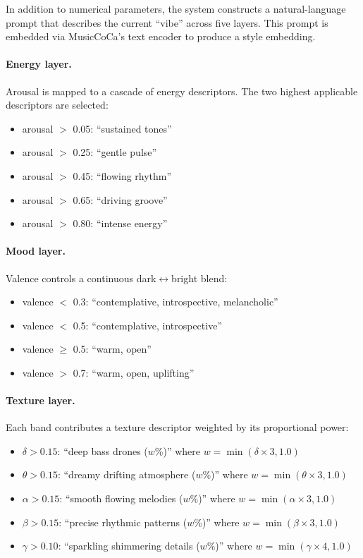 \documentclass[manuscript,review,anonymous]{acmart}
\begin{document}
In addition to numerical parameters, the system constructs a natural-language prompt that describes the current ``vibe'' across five layers. This prompt is embedded via MusicCoCa's text encoder to produce a style embedding.

\paragraph{Energy layer.}
Arousal is mapped to a cascade of energy descriptors. The two highest applicable descriptors are selected:
\begin{itemize}[nosep]
  \item arousal $>$ 0.05: ``sustained tones''
  \item arousal $>$ 0.25: ``gentle pulse''
  \item arousal $>$ 0.45: ``flowing rhythm''
  \item arousal $>$ 0.65: ``driving groove''
  \item arousal $>$ 0.80: ``intense energy''
\end{itemize}

\paragraph{Mood layer.}
Valence controls a continuous dark$\leftrightarrow$bright blend:
\begin{itemize}[nosep]
  \item valence $<$ 0.3: ``contemplative, introspective, melancholic''
  \item valence $<$ 0.5: ``contemplative, introspective''
  \item valence $\geq$ 0.5: ``warm, open''
  \item valence $>$ 0.7: ``warm, open, uplifting''
\end{itemize}

\paragraph{Texture layer.}
Each band contributes a texture descriptor weighted by its proportional power:
\begin{itemize}[nosep]
  \item $\delta > 0.15$: ``deep bass drones ($w$\%)'' where $w = \min(\delta \times 3, 1.0)$
  \item $\theta > 0.15$: ``dreamy drifting atmosphere ($w$\%)'' where $w = \min(\theta \times 3, 1.0)$
  \item $\alpha > 0.15$: ``smooth flowing melodies ($w$\%)'' where $w = \min(\alpha \times 3, 1.0)$
  \item $\beta > 0.15$: ``precise rhythmic patterns ($w$\%)'' where $w = \min(\beta \times 3, 1.0)$
  \item $\gamma > 0.10$: ``sparkling shimmering details ($w$\%)'' where $w = \min(\gamma \times 4, 1.0)$
\end{itemize}
\end{document}
